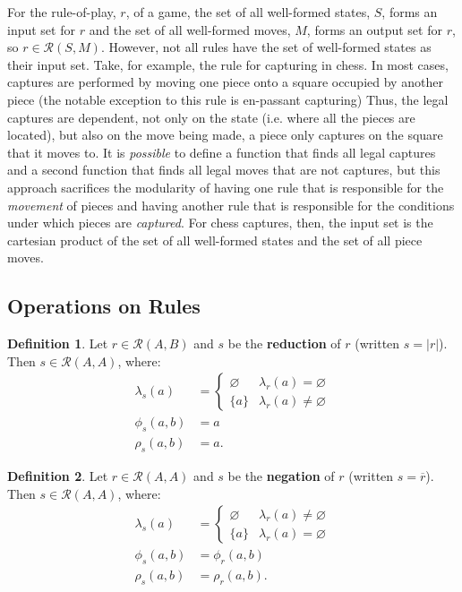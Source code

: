 \documentclass{article}
\theoremstyle{definition}
\newtheorem{definition}{Definition}[subsection]
\theoremstyle{plain}
\def\rule{\mathcal{R}}
\begin{document}
For the rule-of-play, $ r $, of a game,
the set of all well-formed states, $ S $, forms an input set for $ r $
and the set of all well-formed moves, $ M $, forms an output set for $ r $,
so $ r \in \rule (S, M) $.
However, not all rules have the set of well-formed states as their input set.
Take, for example, the rule for capturing in chess.
In most cases, captures are performed by moving one piece onto a square occupied by another piece
(the notable exception to this rule is en-passant capturing)
Thus, the legal captures are dependent, not only on the state (i.e. where all the pieces are located),
but also on the move being made, a piece only captures on the square that it moves to.
It is \emph{possible} to define a function that finds all legal captures
and a second function that finds all legal moves that are not captures,
but this approach sacrifices the modularity of
having one rule that is responsible for the \emph{movement} of pieces
and having another rule that is responsible for the conditions under which pieces are \emph{captured}.
For chess captures, then, the input set is the cartesian product of the set of all well-formed states
and the set of all piece moves.

\subsection{Operations on Rules}

\begin{definition}
  Let $ r \in \rule (A, B) $
  and $ s $ be the \textbf{reduction} of $ r $ (written $ s = |r| $).
  Then $ s \in \rule (A, A) $, where:
  \begin{align}
    \lambda_s (a)    & = \begin{cases}
                           \varnothing & \lambda_r (a) = \varnothing \\
                           \{ a \}     & \lambda_r (a) \neq \varnothing
                         \end{cases} \\
       \phi_s (a, b) & = a \\
       \rho_s (a, b) & = a.
  \end{align}
\end{definition}

\begin{definition}
  Let $ r \in \rule (A, A) $
  and $ s $ be the \textbf{negation} of $ r $ (written $ s = \overline{r} $).
  Then $ s \in \rule (A, A) $, where:
  \begin{align}
    \lambda_s (a)    & = \begin{cases}
                           \varnothing & \lambda_r (a) \neq \varnothing \\
                           \{ a \}     & \lambda_r (a) = \varnothing
                         \end{cases} \\
       \phi_s (a, b) & = \phi_r (a, b) \\
       \rho_s (a, b) & = \rho_r (a, b).
  \end{align}
\end{definition}
\end{document}
